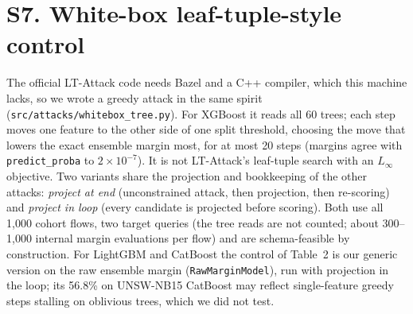 \begin{table}[!htbp]
\centering
\caption*{Table S12. Clean accuracy (\%), F1 (\%) and benign false-positive rate (\%) of the undefended model (U), the certified gate (G), the gate hiding $x_3,x_5$ (G35), the unconstrained 300$\times$8 control (Unc.) and V2.}
\scriptsize
\resizebox{\textwidth}{!}{%
%
}
\end{table}

\begin{table}[!htbp]
\centering
\caption*{Table S13. Whole-cohort evasion (\%) of V2, V2 rebuilt on G35 and the unconstrained control against FFE-v1 ($M=20$), CAPGD and the white-box attacker (WB).}
\footnotesize
\resizebox{\textwidth}{!}{%
%
}
\end{table}

\section*{S7. White-box leaf-tuple-style control}

The official LT-Attack code needs Bazel and a C++ compiler, which this machine lacks, so we wrote a greedy attack in the same spirit (\texttt{src/attacks/whitebox\_tree.py}). For XGBoost it reads all 60 trees; each step moves one feature to the other side of one split threshold, choosing the move that lowers the exact ensemble margin most, for at most 20 steps (margins agree with \texttt{predict\_proba} to $2\times10^{-7}$). It is not LT-Attack's leaf-tuple search with an $L_\infty$ objective. Two variants share the projection and bookkeeping of the other attacks: \emph{project at end} (unconstrained attack, then projection, then re-scoring) and \emph{project in loop} (every candidate is projected before scoring). Both use all 1,000 cohort flows, two target queries (the tree reads are not counted; about 300--1,000 internal margin evaluations per flow) and are schema-feasible by construction. For LightGBM and CatBoost the control of Table~2 is our generic version on the raw ensemble margin (\texttt{RawMarginModel}), run with projection in the loop; its 56.8\% on UNSW-NB15 CatBoost may reflect single-feature greedy steps stalling on oblivious trees, which we did not test.

\begin{table}[!htbp]
\centering
\caption*{Table S14. Real ASR (\%) of the XGBoost white-box control and FFE-v1; exact McNemar $p$ of the in-loop variant against FFE-v1 on the same 1,000 flows.}
\footnotesize

\end{table}

